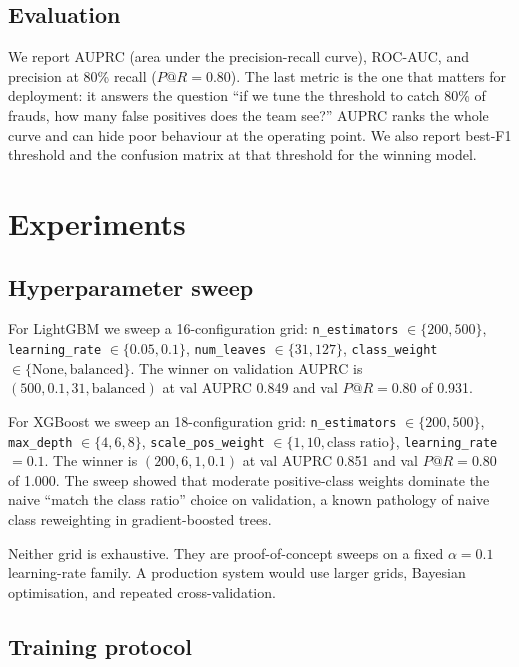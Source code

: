 \documentclass{article}
\begin{document}
\subsection{Evaluation}

We report AUPRC (area under the precision-recall curve), ROC-AUC, and precision at 80\% recall ($P@R{=}0.80$). The last metric is the one that matters for deployment: it answers the question ``if we tune the threshold to catch 80\% of frauds, how many false positives does the team see?'' AUPRC ranks the whole curve and can hide poor behaviour at the operating point. We also report best-F1 threshold and the confusion matrix at that threshold for the winning model.

\section{Experiments}
\label{sec:experiments}

\subsection{Hyperparameter sweep}

For LightGBM we sweep a 16-configuration grid: \texttt{n\_estimators} $\in \{200, 500\}$, \texttt{learning\_rate} $\in \{0.05, 0.1\}$, \texttt{num\_leaves} $\in \{31, 127\}$, \texttt{class\_weight} $\in \{\text{None}, \text{balanced}\}$. The winner on validation AUPRC is $(500, 0.1, 31, \text{balanced})$ at val AUPRC 0.849 and val $P@R{=}0.80$ of 0.931.

For XGBoost we sweep an 18-configuration grid: \texttt{n\_estimators} $\in \{200, 500\}$, \texttt{max\_depth} $\in \{4, 6, 8\}$, \texttt{scale\_pos\_weight} $\in \{1, 10, \text{class ratio}\}$, \texttt{learning\_rate} $= 0.1$. The winner is $(200, 6, 1, 0.1)$ at val AUPRC 0.851 and val $P@R{=}0.80$ of 1.000. The sweep showed that moderate positive-class weights dominate the naive ``match the class ratio'' choice on validation, a known pathology of naive class reweighting in gradient-boosted trees.

Neither grid is exhaustive. They are proof-of-concept sweeps on a fixed $\alpha{=}0.1$ learning-rate family. A production system would use larger grids, Bayesian optimisation, and repeated cross-validation.

\subsection{Training protocol}
\end{document}
